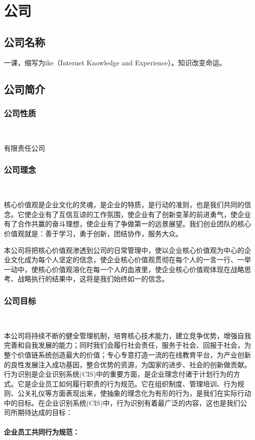 \section{公司}
\subsection{公司名称}
一课，缩写为ike（Internet Knowledge and Experience）。知识改变命运。
\subsection{公司简介}
\subsubsection{公司性质}\

有限责任公司
\subsubsection{公司理念}\

核心价值观是企业文化的灵魂，是企业的特质，是行动的准则，也是我们共同的信念。它使企业有了互信互谅的工作氛围，使企业有了创新变革的前进勇气，使企业有了合作共赢的奋斗理想，使企业有了争做第一的远景展望。我们创业团队的核心价值观就是：善于学习，勇于创新，团结协作，服务大众。

本公司将把核心价值观渗透到公司的日常管理中，使以企业核心价值观为中心的企业文化成为每个人坚定的信念，使企业核心价值观贯彻在每个人的一言一行、一举一动中，使核心价值观溶化在每一个人的血液里，使企业核心价值观体现在战略思考、战略执行的结果中，这将是我们始终如一的信念。

\subsubsection{公司目标}\

本公司将持续不断的健全管理机制，培育核心技术能力，建立竞争优势，增强自我完善和自我发展的能力；同时我们会履行社会责任，服务于社会、回报于社会，为整个价值链系统创造最大的价值；专心专意打造一流的在线教育平台，为产业创新的良性发展注入成功基因，整合优势的资源，为国家的进步、社会的创新做贡献。行为识别是企业识别系统(CIS)中的重要方面，是企业理念付诸于计划行为的方式。它是企业员工如何履行职责的行为规范。它在组织制度、管理培训、行为规则、公关礼仪等方面表现出来，使抽象的理念化为有形的行为，是我们在实际行动中的目标。在企业识别系统(CIS)中，行为识别有着最广泛的内容，这也是我们公司所期待达成的目标：
\paragraph{企业员工共同行为规范：}\

